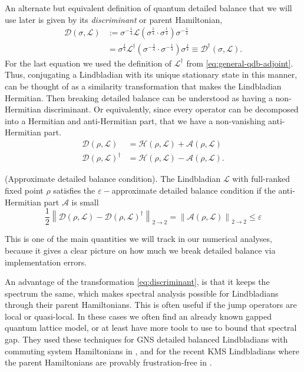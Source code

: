 An alternate but equivalent definition of quantum detailed balance that we will use later is given by its \textit{discriminant} or parent Hamiltonian, 
\begin{equation}
    \label{eq:discriminant}
    \begin{split}
        \mathcal{D}(\sigma, \mathcal{L}) &:= \sigma^{-\frac{1}{4}}\mathcal{L}(\sigma^{\frac{1}{4}} \cdot \sigma^{\frac{1}{4}})\sigma^{-\frac{1}{4}} \\
        &= \sigma^{\frac{1}{4}}\mathcal{L}^\dagger(\sigma^{-\frac{1}{4}} \cdot \sigma^{-\frac{1}{4}})\sigma^{\frac{1}{4}} \equiv \mathcal{D}^\dagger(\sigma, \mathcal{L}).
    \end{split}
\end{equation}
For the last equation we used the definition of $\mathcal{L}^\dagger$ from \eqref{eq:general-qdb-adjoint}. Thus, conjugating a Lindbladian with its unique stationary state in this manner, can be thought of as a similarity transformation that makes the Lindbladian Hermitian. 
Then breaking detailed balance can be understood as having a non-Hermitian discriminant. Or equivalently, since every operator can be decomposed into a Hermitian and anti-Hermitian part, that we have a non-vanishing anti-Hermitian part.
\begin{equation}
    \begin{split}
        \mathcal{D}(\rho, \mathcal{L}) &= \mathcal{H}(\rho, \mathcal{L}) + \mathcal{A}(\rho, \mathcal{L}) \\
        \mathcal{D}(\rho, \mathcal{L})^\dagger &= \mathcal{H}(\rho, \mathcal{L}) - \mathcal{A}(\rho, \mathcal{L}).
    \end{split}
\end{equation}
\begin{definition} \label{def:approx-db}
    \textup{(Approximate detailed balance condition)}. The Lindbladian $\mathcal{L}$ with full-ranked fixed point $\rho$ satisfies the $\varepsilon-$approximate detailed balance condition if the anti-Hermitian part $\mathcal{A}$ is small
    $$
    \frac{1}{2}\left\|\mathcal{D}(\rho, \mathcal{L}) - \mathcal{D}(\rho, \mathcal{L})^\dagger \right\|_{2\rightarrow2} = \left\|\mathcal{A}(\rho, \mathcal{L})\right\|_{2\rightarrow2} \leq \varepsilon
    $$
\end{definition}
This is one of the main quantities we will track in our numerical analyses, because it gives a clear picture on how much we break detailed balance via implementation errors.

An advantage of the transformation \eqref{eq:discriminant}, is that it keeps the spectrum the same, which makes spectral analysis possible for Lindbladians through their parent Hamiltonians. This is often useful if the jump operators are local or quasi-local. In these cases we often find an already known gapped quantum lattice model, or at least have more tools to use to bound that spectral gap. They used these techniques for GNS detailed balanced Lindbladians with commuting system Hamiltonians in \cite{kastoryano2016quantum}, and for the recent KMS Lindbladians where the parent Hamiltonians are provably frustration-free in \cite{rouze2025efficient,bergamaschi2024quantum,vsmid2025polynomial}.


